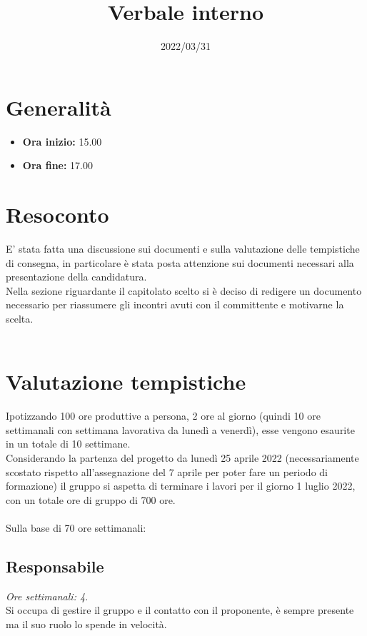 \documentclass{classes/base}
\title{Verbale interno}
\date{2022/03/31}
\author{\marcob}
\renewcommand{\maketitle}{
    
}
\begin{document}
    \maketitle

    \section{Generalità}
    \begin{itemize}
        \item \textbf{Ora inizio:} 15.00
        \item \textbf{Ora fine:} 17.00
    \end{itemize}
    
    \section{Resoconto}
    E' stata fatta una discussione sui documenti e sulla valutazione delle tempistiche di consegna, in particolare è stata posta attenzione sui documenti necessari alla presentazione della candidatura.\\
    Nella sezione riguardante il capitolato scelto si è deciso di redigere un documento necessario per riassumere gli incontri avuti con il committente e motivarne la scelta.\\\\

    \section*{Valutazione tempistiche}
    Ipotizzando 100 ore produttive a persona, 2 ore al giorno (quindi 10 ore settimanali con settimana lavorativa da lunedì a venerdì), esse vengono esaurite in un totale di 10 settimane.\\
    Considerando la partenza del progetto da lunedì 25 aprile 2022 (necessariamente scostato rispetto all'assegnazione del 7 aprile per poter fare un periodo di formazione) il gruppo si aspetta di terminare i lavori per il giorno 1 luglio 2022, con un totale ore di gruppo di 700 ore.\\\\
    Sulla base di 70 ore settimanali:
    \subsection*{Responsabile}
    \textit{Ore settimanali: 4}.\\
    Si occupa di gestire il gruppo e il contatto con il proponente, è sempre presente ma il suo ruolo lo spende in velocità.
\end{document}
